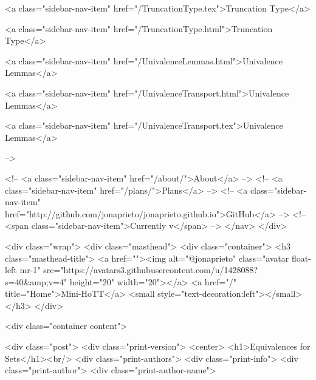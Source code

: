       
    
      
        
          <a class="sidebar-nav-item" href="/TruncationType.tex">Truncation Type</a>
        
      
    
      
        
          <a class="sidebar-nav-item" href="/TruncationType.html">Truncation Type</a>
        
      
    
      
        
          <a class="sidebar-nav-item" href="/UnivalenceLemmas.html">Univalence Lemmas</a>
        
      
    
      
        
          <a class="sidebar-nav-item" href="/UnivalenceTransport.html">Univalence Lemmas</a>
        
      
    
      
        
          <a class="sidebar-nav-item" href="/UnivalenceTransport.tex">Univalence Lemmas</a>
        
      
     -->

    <!-- <a class="sidebar-nav-item" href="/about/">About</a> -->
    <!-- <a class="sidebar-nav-item" href="/plans/">Plans</a> -->
    <!-- <a class="sidebar-nav-item" href="http://github.com/jonaprieto/jonaprieto.github.io">GitHub</a> -->
    <!-- <span class="sidebar-nav-item">Currently v</span> -->
  </nav>
</div>

    <div class="wrap">
      <div class="masthead">
        <div class="container">
          <h3 class="masthead-title">
            <a href=""><img alt="@jonaprieto" class="avatar float-left mr-1" src="https://avatars3.githubusercontent.com/u/1428088?s=40&amp;v=4" height="20" width="20"></a>
            <a href="/" title="Home">Mini-HoTT</a>
            <small style="text-decoration:left"></small>
          </h3>
        </div>
      
      <div class="container content">
        







<div class="post">
  <div class="print-version">
    <center>
      <h1>Equivalences for Sets</h1><br/>
        <div class="print-authors">
          <div class="print-info">
            <div class="print-author">
              <div class="print-author-name">
                
